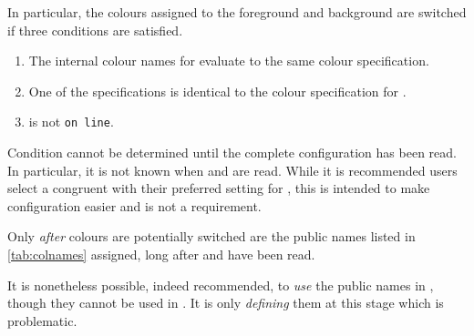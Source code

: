 \documentclass[10pt,british,a4paper]{ltxdoc}
\begin{document}
In particular, the colours assigned to the  foreground and background are switched if three conditions are satisfied.
\begin{enumerate}
  \item The internal colour names for  evaluate to the same colour specification.
  \item One of the specifications is identical to the colour specification for .
  \item\label{condition:off-line}  is not \texttt{on line}.
\end{enumerate}
Condition  cannot be determined until the complete configuration has been read.
In particular, it is not known when \colschemeslabelname{} and \chronosstyleslabelname{} are read.
While it is recommended users select a \chronosstylelabelname{} congruent with their preferred setting for , this is intended to make configuration easier and is not a requirement.

Only \emph{after} colours are potentially switched are the public names listed in \cref{tab:colnames} assigned, long after  and  have been read.

It is nonetheless possible, indeed recommended, to \emph{use} the public names in \chronosstyleslabelname{}, though they cannot be used in \colschemeslabelname{}.
It is only \emph{defining} them at this stage which is problematic.
\end{document}
